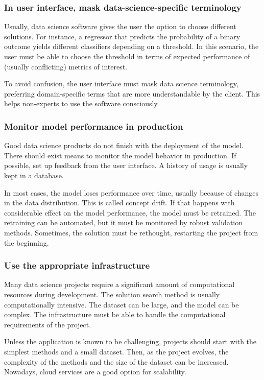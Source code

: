 \subsubsection{In user interface, mask data-science-specific terminology}

Usually, data science software gives the user the option to choose different solutions.
For instance, a \gls{regressor} that predicts the probability of a binary outcome yields
different \glspl{classifier} depending on a threshold.  In this scenario, the user must be able
to choose the threshold in terms of expected performance of (usually conflicting) metrics
of interest.

To avoid confusion, the user interface must mask data science
terminology, preferring domain-specific terms that are more understandable by the client.
This helps non-experts to use the software consciously.

\subsubsection{Monitor model performance in production}

Good data science products do not finish with the deployment of the model.  There should
exist means to monitor the model behavior in production.  If possible, set up feedback from
the user interface.  A history of usage is usually kept in a database.

In most cases, the model loses performance over time, usually because of changes in
the data distribution.  This is called concept drift.
If that happens with considerable effect on the model performance, the model must be
retrained.  The retraining can be automated, but it must be monitored by robust validation
methods. Sometimes, the solution must be rethought, restarting the project from the
beginning.

\subsubsection{Use the appropriate infrastructure}

Many data science projects require a significant amount of computational resources during development.
The solution search method is usually computationally intensive.  The dataset can be
large, and the model can be complex.  The infrastructure must be able to handle the
computational requirements of the project.

Unless the application is known to be challenging, projects should start with the simplest methods
and a small dataset.  Then, as the project evolves, the complexity of the methods and the
size of the dataset can be increased.  Nowadays, cloud services are a good option for
scalability.

